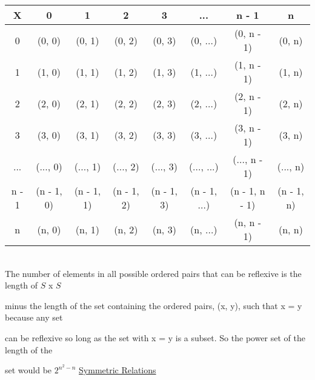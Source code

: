 \documentclass[11pt]{article}
\begin{document}
	\begin{tabular}{|c |c c c c c c c|} 
 		\hline
 		X & 0 & 1 & 2 & 3 &... & n - 1 & n\\ [0.5ex] 
 		\hline
 		0 & (0, 0) &  \cellcolor{red!25}(0, 1) &  \cellcolor{red!25}(0, 2) &  \cellcolor{red!25}(0, 3) &  \cellcolor{red!25}(0, ...) &  \cellcolor{red!25}(0, n - 1) &  \cellcolor{red!25}(0, n)\\ 
 		\hline
		1 & \cellcolor{red!25}(1, 0) & (1, 1) &  \cellcolor{red!25}(1, 2) &  \cellcolor{red!25}(1, 3) &  \cellcolor{red!25}(1, ...) &  \cellcolor{red!25}(1, n - 1) &  \cellcolor{red!25}(1, n)\\ 
 		\hline
		2 & \cellcolor{red!25}(2, 0) & \cellcolor{red!25}(2, 1) & (2, 2) &  \cellcolor{red!25}(2, 3) &  \cellcolor{red!25}(2, ...) &  \cellcolor{red!25}(2, n - 1) &  \cellcolor{red!25}(2, n)\\ 
 		\hline
		3 & \cellcolor{red!25}(3, 0) & \cellcolor{red!25}(3, 1) & \cellcolor{red!25}(3, 2) & (3, 3) &  \cellcolor{red!25}(3, ...) &  \cellcolor{red!25}(3, n - 1) &  \cellcolor{red!25}(3, n)\\ 
 		\hline
		... & \cellcolor{red!25}(..., 0) & \cellcolor{red!25}(..., 1) & \cellcolor{red!25}(..., 2) & \cellcolor{red!25}(..., 3) & (..., ...) &  \cellcolor{red!25}(..., n - 1) &  \cellcolor{red!25}(..., n)\\ 
 		\hline
		n - 1 & \cellcolor{red!25}(n - 1, 0) & \cellcolor{red!25}(n - 1, 1) & \cellcolor{red!25}(n - 1, 2) & \cellcolor{red!25}(n - 1, 3) & \cellcolor{red!25}(n - 1, ...) & (n - 1, n - 1) &  \cellcolor{red!25}(n - 1, n)\\ 
 		\hline
		n & \cellcolor{red!25}(n, 0) & \cellcolor{red!25}(n, 1) & \cellcolor{red!25}(n, 2) & \cellcolor{red!25}(n, 3) & \cellcolor{red!25}(n, ...) & \cellcolor{red!25}(n, n - 1) & (n, n)\\ 
 		\hline
	\end{tabular}\\

	The number of elements in all possible ordered pairs that can be reflexive is the length of $S$ x $S$

	minus the length of the set containing the ordered pairs, (x, y), such that x = y because any set 

	can be reflexive so long as the set with x = y is a subset. So the power set of the length of the 

	set would be $2^{n^2 - n}$
\newpage
	\underline{Symmetric Relations} \\
	
\end{document}
